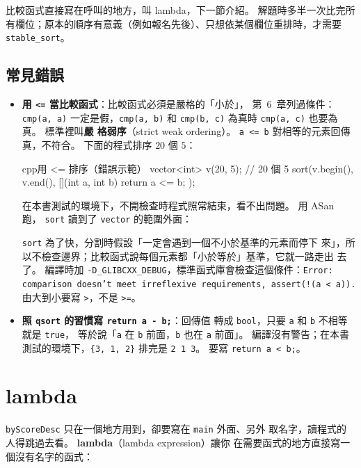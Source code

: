 比較函式直接寫在呼叫的地方，叫 lambda，下一節介紹。 解題時多半一次比完所
有欄位；原本的順序有意義（例如報名先後）、只想依某個欄位重排時，才需要
\texttt{stable\_sort}。

\subsection{常見錯誤}

\begin{itemize}
\item \textbf{用 \texttt{<=} 當比較函式}：比較函式必須是嚴格的「小於」，
第~6~章列過條件：\texttt{cmp(a, a)} 一定是假，\texttt{cmp(a, b)} 和
\texttt{cmp(b, c)} 為真時 \texttt{cmp(a, c)} 也要為真。 標準裡叫\textbf{嚴
格弱序}（strict weak ordering）。 \texttt{a <= b} 對相等的元素回傳真，不符合。
下面的程式排序 $20$ 個 $5$：
\begin{code}{cpp}{用 <= 排序（錯誤示範）}
vector<int> v(20, 5);            // 20 個 5
sort(v.begin(), v.end(), [](int a, int b) { return a <= b; });
\end{code}
在本書測試的環境下，不開檢查時程式照常結束，看不出問題。 用 ASan 跑，
\texttt{sort} 讀到了 \texttt{vector} 的範圍外面：
\texttt{sort} 為了快，分割時假設「一定會遇到一個不小於基準的元素而停下
來」，所以不檢查邊界；比較函式說每個元素都「小於等於」基準，它就一路走出
去了。 編譯時加 \texttt{-D\_GLIBCXX\_DEBUG}，標準函式庫會檢查這個條件：\texttt{Error: comparison doesn't meet irreflexive
requirements, assert(!(a < a)).} 由大到小要寫 \texttt{>}，不是
\texttt{>=}。
\item \textbf{照 \texttt{qsort} 的習慣寫 \texttt{return a - b;}}：回傳值
轉成 \texttt{bool}，只要 \texttt{a} 和 \texttt{b} 不相等就是 \texttt{true}，
等於說「\texttt{a} 在 \texttt{b} 前面，\texttt{b} 也在 \texttt{a} 前面」。
編譯沒有警告；在本書測試的環境下，\texttt{\{3, 1, 2\}} 排完是
\texttt{2 1 3}。 要寫 \texttt{return a < b;}。
\end{itemize}

\section{lambda}
\label{sec:lambda}

\texttt{byScoreDesc} 只在一個地方用到，卻要寫在 \texttt{main} 外面、另外
取名字，讀程式的人得跳過去看。 \textbf{lambda}（lambda expression）讓你
在需要函式的地方直接寫一個沒有名字的函式：

